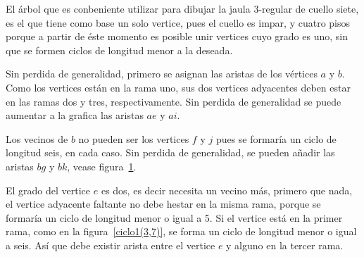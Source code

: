 \documentclass[11pt]{book}
\theoremstyle{definition}
\begin{document}


El árbol que es conbeniente utilizar para dibujar la jaula $3$-regular
de cuello siete, es el que tiene como base un solo vertice, pues el
cuello es impar, y cuatro pisos porque a partir de éste momento es
posible unir vertices cuyo grado es uno, sin que se formen ciclos de
longitud menor a la deseada. 


Sin perdida de generalidad, primero se asignan las aristas de los
vértices $a$ y $b$. Como los vertices están en la rama uno, sus dos
vertices adyacentes deben estar en las ramas dos y tres,
respectivamente. Sin perdida de generalidad se puede aumentar a la
grafica las aristas $ae$ y $ai$. 

Los vecinos de $b$ no pueden ser los vertices $f$ y $j$ pues se
formaría un ciclo de longitud seis, en cada caso. Sin perdida de
generalidad, se pueden añadir las aristas $bg$ y $bk$, vease figura~\ref{arbol(3,7)}.

\begin{figure}
  \centering
  \caption{} \label{arbol(3,7)}
\end{figure}

El grado del vertice $e$  es dos, es decir necesita un
vecino más, primero que nada, el vertice adyacente faltante no debe
hestar en la misma rama, porque se formaría un ciclo de longitud
menor o igual a 5. Si el vertice está en la primer rama, como en la
figura~\ref{ciclo1(3,7)}, se forma un ciclo de longitud menor o igual
a seis. Así que debe existir arista entre el vertice $e$ y alguno en
la tercer rama.
\end{document}
